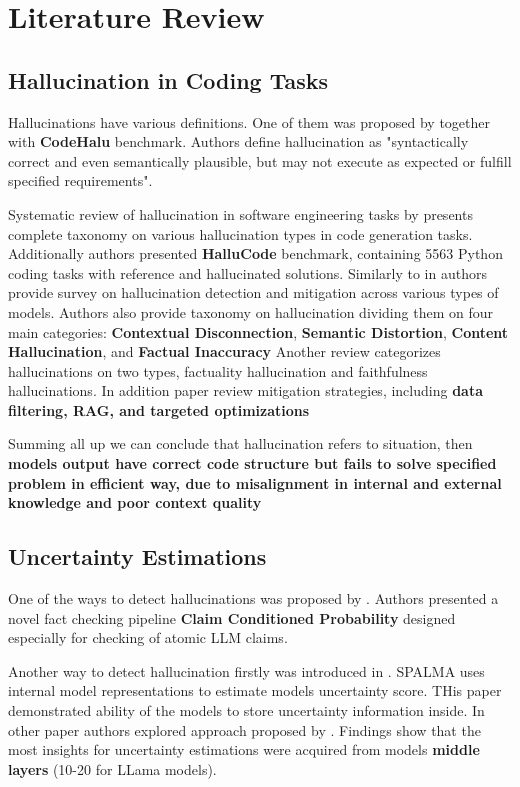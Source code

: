 \section{Literature Review}
\subsection{Hallucination in Coding Tasks}
Hallucinations have various definitions. One of them was proposed by \cite{tian2025codehalu} together with
\textbf{CodeHalu} benchmark. Authors define hallucination as "syntactically correct and even semantically plausible, but may not execute as expected or fulfill specified requirements".

Systematic review of hallucination in software engineering tasks by \cite{liu2024exploring}
presents complete taxonomy on various hallucination types in code generation tasks.
Additionally authors presented \textbf{HalluCode} benchmark, containing 5563 Python coding tasks
with reference and hallucinated solutions.
Similarly to \cite{liu2024exploring} in \cite{sahoo2024comprehensive} authors provide survey on hallucination detection and
mitigation across various types of models. Authors also provide taxonomy on hallucination dividing
them on four main categories: \textbf{Contextual Disconnection}, \textbf{Semantic Distortion}, \textbf{Content Hallucination}, and \textbf{Factual Inaccuracy}
Another review \cite{huang2025survey} categorizes hallucinations on two types, factuality hallucination and faithfulness hallucinations. In addition 
paper review mitigation strategies, including \textbf{data filtering, RAG, and targeted optimizations} 

Summing all up we can conclude that hallucination refers to situation, then \textbf{models output
have correct code structure but fails to solve specified problem in efficient way, due to misalignment in internal and external knowledge and poor context quality} 

\subsection{Uncertainty Estimations}
One of the ways to detect hallucinations was proposed by \cite{fadeeva2024fact}. Authors presented
a novel fact checking pipeline \textbf{Claim Conditioned Probability} designed especially for
checking of atomic LLM claims.

Another way to detect hallucination firstly was introduced in \cite{azaria2023internalstatellmknows}. SPALMA
uses internal model representations to estimate models uncertainty score. THis paper demonstrated
ability of the models to store uncertainty information inside.
In other paper \cite{duan2024llms} authors explored approach proposed by \cite{azaria2023internalstatellmknows}. Findings show that
the most insights for uncertainty estimations were acquired from models \textbf{middle layers} (10-20 for LLama models).

